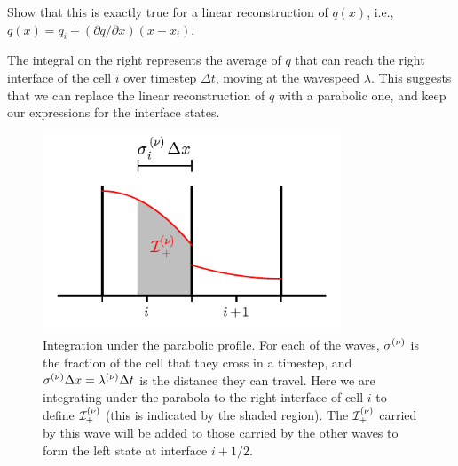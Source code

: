 \begin{exercise}
{Show that this is exactly true for a linear reconstruction of $q(x)$, i.e.,
$q(x) = q_i + (\partial q/\partial x) (x - x_i)$.}
\end{exercise}

\noindent The integral on the right represents the average of $q$ that
can reach the right interface of the cell $i$ over timestep $\Delta
t$, moving at the wavespeed $\lambda$.  This suggests that we can
replace the linear reconstruction of $q$ with a parabolic one, and
keep our expressions for the interface states.

\begin{figure}
\centering
\includegraphics[width=3.5in]{ppm-trace}
\caption[Integration under the parabola profile for to an
  interface.]{\label{fig:ppm_trace} Integration under the parabolic
  profile.  For each of the waves, $\sigma^{(\nu)}$ is the fraction of
  the cell that they cross in a timestep, and $\sigma^{(\nu)} \Delta x =
  \lambda^{(\nu)} \Delta t$ is the distance they can travel.  Here we are
  integrating under the parabola to the right interface of cell $i$ to
  define $\mathcal{I}_+^{(\nu)}$ (this is indicated by the shaded
  region).  The $\mathcal{I}_+^{(\nu)}$ carried by this wave will be
  added to those carried by the other waves to form the left state at
  interface $i+1/2$.}
\end{figure}

